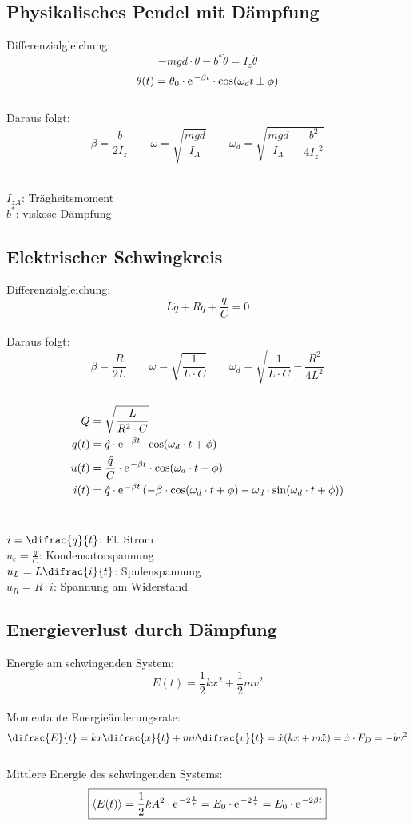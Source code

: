 \subsection{Physikalisches Pendel mit Dämpfung}
Differenzialgleichung:
\[
	-mgd\cdot\theta-b^*\dot{\theta} = I_z \ddot{\theta}
\]
\[
	\theta(t) = \theta_0 \cdot \mathrm{e\;\!}^{-\beta t} \cdot \cos(\omega_d t \pm \phi)
\]
\\
Daraus folgt:
\[
	\beta = \frac{b}{2I_z} \qquad \omega = \sqrt{\frac{mgd}{I_A}} \qquad \omega_d = \sqrt{\frac{mgd}{I_A} - \frac{b^2}{4{I_z}^2}}
\]
\\
\begin{footnotesize}
	$I_{zA}$: Trägheitsmoment\\
	$b^*$: viskose Dämpfung
\end{footnotesize}


\subsection{Elektrischer Schwingkreis}
Differenzialgleichung:
\[
	L\ddot{q} + R\dot{q} + \frac{q}{C} = 0
\]
\\
Daraus folgt:
\[
	\beta = \frac{R}{2L} \qquad \omega = \sqrt{\frac{1}{L \cdot C}} \qquad \omega_d = \sqrt{\frac{1}{L \cdot C} - \frac{R^2}{4{L}^2}}
\]
\\
\[\begin{aligned}
	Q&=\sqrt{\frac{L}{R^2 \cdot C}} \\
	q(t) &= \hat{q}\cdot \mathrm{e\;\!}^{-\beta t}\cdot \cos(\omega_d \cdot t + \phi) \\
	u(t) &= \frac{\hat{q}}{C} \cdot \mathrm{e\;\!}^{-\beta t}\cdot \cos(\omega_d \cdot t + \phi) \\
	i(t) &= \hat{q} \cdot \mathrm{e\;\!}^{-\beta t}\left(-\beta \cdot \cos(\omega_d \cdot t + \phi) - \omega_d \cdot \sin(\omega_d \cdot t + \phi) \right)
\end{aligned}\]
\\
\begin{footnotesize}
	$i=\difrac{q}{t}$: El. Strom\\
	$u_c = \frac{q}{C}$: Kondensatorspannung\\
	$u_L = L\difrac{i}{t}$: Spulenspannung\\
	$u_R = R \cdot i$: Spannung am Widerstand
\end{footnotesize}



\subsection{Energieverlust durch Dämpfung}
Energie am schwingenden System:
\[
	E(t) = \frac12 kx^2 + \frac12 mv^2
\]
\\
Momentante Energieänderungsrate:
\[
	\difrac{E}{t} = kx \difrac{x}{t}+ mv \difrac{v}{t} = \dot{x}(kx + m\ddot{x}) = \dot{x}\cdot F_D = -bv^2
\]
\\
Mittlere Energie des schwingenden Systems:
\[\boxed{
	\left\langle E(t) \right\rangle = \frac12 kA^2 \cdot \mathrm{e\;\!}^{-2\frac{t}{\tau}} = E_0 \cdot \mathrm{e\;\!}^{-2\frac{t}{\tau}} = E_0 \cdot \mathrm{e\;\!}^{-2\beta t} 
}\]


